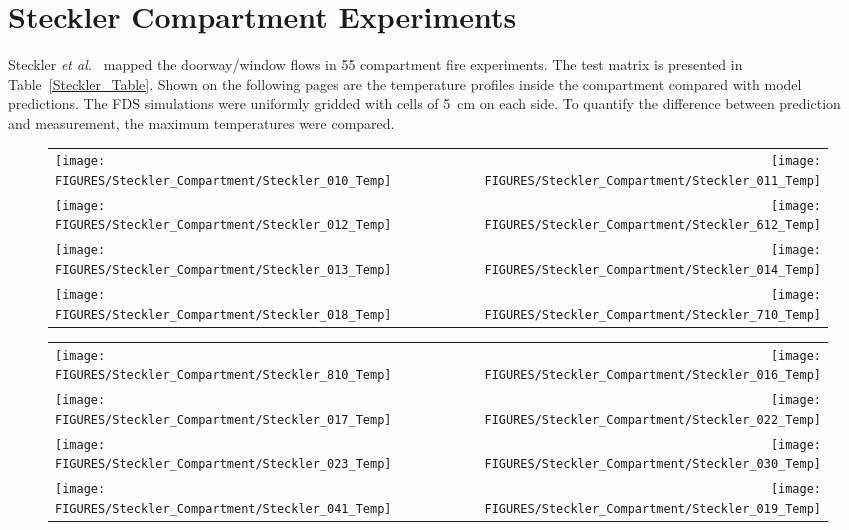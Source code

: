 \clearpage





\section{Steckler Compartment Experiments}

Steckler {\em et al.}~\cite{Steckler:NBSIR_82-2520} mapped the doorway/window flows in 55 compartment fire experiments. The test matrix
is presented in Table~\ref{Steckler_Table}. Shown on
the following pages are the temperature profiles inside the compartment compared with model predictions.  The FDS
simulations were uniformly gridded with cells of 5~cm on each side. To quantify the difference between prediction and measurement, the
maximum temperatures were compared.



\begin{figure}[p]
\begin{tabular*}{\textwidth}{l@{\extracolsep{\fill}}r}
\texttt{[image: FIGURES/Steckler\_Compartment/Steckler\_010\_Temp]} &
\texttt{[image: FIGURES/Steckler\_Compartment/Steckler\_011\_Temp]} \\
\texttt{[image: FIGURES/Steckler\_Compartment/Steckler\_012\_Temp]} &
\texttt{[image: FIGURES/Steckler\_Compartment/Steckler\_612\_Temp]} \\
\texttt{[image: FIGURES/Steckler\_Compartment/Steckler\_013\_Temp]} &
\texttt{[image: FIGURES/Steckler\_Compartment/Steckler\_014\_Temp]} \\
\texttt{[image: FIGURES/Steckler\_Compartment/Steckler\_018\_Temp]} &
\texttt{[image: FIGURES/Steckler\_Compartment/Steckler\_710\_Temp]}
\end{tabular*}
\label{Steckler_Temp_1}
\end{figure}

\begin{figure}[p]
\begin{tabular*}{\textwidth}{l@{\extracolsep{\fill}}r}
\texttt{[image: FIGURES/Steckler\_Compartment/Steckler\_810\_Temp]} &
\texttt{[image: FIGURES/Steckler\_Compartment/Steckler\_016\_Temp]} \\
\texttt{[image: FIGURES/Steckler\_Compartment/Steckler\_017\_Temp]} &
\texttt{[image: FIGURES/Steckler\_Compartment/Steckler\_022\_Temp]} \\
\texttt{[image: FIGURES/Steckler\_Compartment/Steckler\_023\_Temp]} &
\texttt{[image: FIGURES/Steckler\_Compartment/Steckler\_030\_Temp]} \\
\texttt{[image: FIGURES/Steckler\_Compartment/Steckler\_041\_Temp]} &
\texttt{[image: FIGURES/Steckler\_Compartment/Steckler\_019\_Temp]}
\end{tabular*}
\label{Steckler_Temp_2}
\end{figure}

